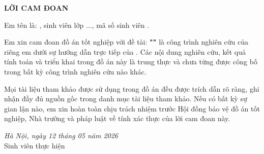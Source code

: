 \documentclass[../main.tex]{subfiles}
\begin{document}
\begin{center}
    \textbf{\huge LỜI CAM ĐOAN}
\end{center}
\vspace{0.5cm}

Em tên là: \textbf{\AUTHOR}, sinh viên lớp ..., mã số sinh viên \textbf{\STUDENTID}.

Em xin cam đoan đồ án tốt nghiệp với đề tài: \textbf{"\PROJECTTITLE"} là công trình nghiên cứu của riêng em dưới sự hướng dẫn trực tiếp của \textbf{\INSTRUCTOR}. Các nội dung nghiên cứu, kết quả tính toán và triển khai trong đồ án này là trung thực và chưa từng được công bố trong bất kỳ công trình nghiên cứu nào khác.

Mọi tài liệu tham khảo được sử dụng trong đồ án đều được trích dẫn rõ ràng, ghi nhận đầy đủ nguồn gốc trong danh mục tài liệu tham khảo. Nếu có bất kỳ sự gian lận nào, em xin hoàn toàn chịu trách nhiệm trước Hội đồng bảo vệ đồ án tốt nghiệp, Nhà trường và pháp luật về tính xác thực của lời cam đoan này.

\begin{flushright}
    \textit{Hà Nội, ngày 12 tháng 05 năm 2026} \\
    Sinh viên thực hiện \\
    \vspace{2cm}
    \textbf{\AUTHOR}
\end{flushright}
\end{document}
